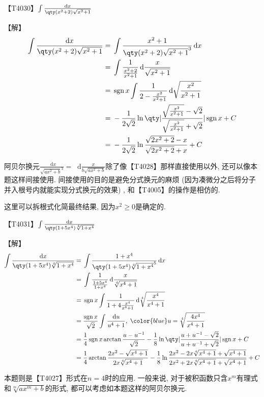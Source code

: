 \documentclass{ctexbook}
\DeclareMathOperator{\sgn}{sgn}
\newcommand*{\dif}{\mathop{}\!\mathrm{d}}
\begin{document}
{【T4030】$\int\frac{\dif{x}}{\qty(x^{2}+2)\sqrt{x^{2}+1}}$\par
【解】
\begin{align*}
\int\frac{\dif{x}}{\qty(x^{2}+2)\sqrt{x^{2}+1}}={}&\int\frac{x^{2}+1}{\qty(x^{2}+2)\sqrt{x^{2}+1}^{3}}\dif{x}\\
={}&\int\frac{1}{\frac{x^{2}+2}{x^{2}+1}}\dif{\frac{x}{\sqrt{x^{2}+1}}}\\
={}&\sgn{x}\int\frac{1}{2-\frac{x^{2}}{x^{2}+1}}\dif{\sqrt{\frac{x^{2}}{x^{2}+1}}}\\
={}&-\frac{1}{2\sqrt{2}}\ln\qty|\frac{\sqrt{\frac{x^{2}}{x^{2}+1}}-\sqrt{2}}{\sqrt{\frac{x^{2}}{x^{2}+1}}+\sqrt{2}}|\sgn{x}+C\\
={}&-\frac{1}{2\sqrt{2}}\ln{\frac{\sqrt{2x^{2}+2}-x}{\sqrt{2x^{2}+2}+x}}+C
\end{align*}\par
{\kaishu 阿贝尔换元$\frac{\dif{x}}{\sqrt{ax^{2}+b}^{3}}=\dif{\frac{x}{b\sqrt{ax^{2}+b}}}$除了像【T4028】那样直接使用以外, 还可以像本题这样间接使用. 间接使用的目的是避免分式换元的麻烦 (因为凑微分之后将分子并入根号内就能实现分式换元的效果) , 和【T4005】的操作是相仿的. \par
这里可以拆根式化简最终结果, 因为$x^{2}\ge0$是确定的. \par}
【T4031】$\int\frac{\dif{x}}{\qty(1+5x^{4})\sqrt[4]{1+x^{4}}}$\par
【解】
\begin{align*}
\int\frac{\dif{x}}{\qty(1+5x^{4})\sqrt[4]{1+x^{4}}}={}&\int\frac{1+x^{4}}{\qty(1+5x^{4})\sqrt[4]{1+x^{4}}^{5}}\dif{x}\\
={}&\int\frac{1}{\frac{1+5x^{4}}{1+x^{4}}}\dif{\frac{x}{\sqrt[4]{x^{4}+1}}}\\
={}&\sgn{x}\int\frac{1}{1+4\frac{x^{4}}{x^{4}+1}}\dif{\sqrt[4]{\frac{x^{4}}{x^{4}+1}}}\\
={}&\frac{\sgn{x}}{\sqrt{2}}\int\frac{\dif{u}}{u^{4}+1},\;{\color{blue}u=\sqrt[4]{\frac{4x^{4}}{x^{4}+1}}}\\
={}&\frac{1}{4}\sgn{x}\arctan{\frac{u-u^{-1}}{\sqrt{2}}}-\frac{1}{8}\ln\qty|\frac{u+u^{-1}-\sqrt{2}}{u+u^{-1}+\sqrt{2}}|\sgn{x}+C\\
={}&\frac{1}{4}\arctan{\frac{2x^{2}-\sqrt{x^{4}+1}}{2x\sqrt[4]{x^{4}+1}}}-\frac{1}{8}\ln\frac{2x^{2}-2x\sqrt[4]{x^{4}+1}+\sqrt{x^{4}+1}}{2x^{2}+2x\sqrt[4]{x^{4}+1}+\sqrt{x^{4}+1}}+C
\end{align*}\par
{\kaishu 本题则是【T4027】形式在$n=4$时的应用. 一般来说, 对于被积函数只含$x^{m}$有理式和$\sqrt[m]{ax^{m}+b}$的形式, 都可以考虑如本题这样的阿贝尔换元. \par}
}
\end{document}
